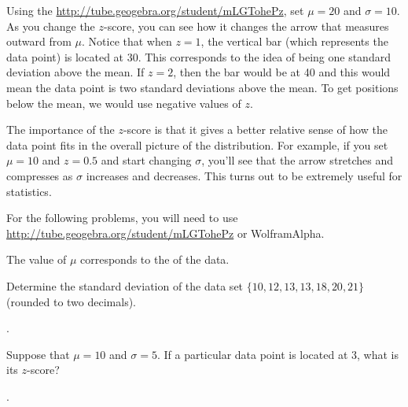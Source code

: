 \documentclass{ximera}
\begin{document}
Using the \href{http://tube.geogebra.org/student/mLGTohePz}{http://tube.geogebra.org/student/mLGTohePz}, set $\mu = 20$ and $\sigma = 10$. As you change the $z$-score, you can see how it changes the arrow that measures outward from $\mu$. Notice that when $z = 1$, the vertical bar (which represents the data point) is located at 30. This corresponds to the idea of being one standard deviation above the mean. If $z = 2$, then the bar would be at 40 and this would mean the data point is two standard deviations above the mean. To get positions below the mean, we would use negative values of $z$.

The importance of the $z$-score is that it gives a better relative sense of how the data point fits in the overall picture of the distribution. For example, if you set $\mu = 10$ and $z = 0.5$ and start changing $\sigma$, you'll see that the arrow stretches and compresses as $\sigma$ increases and decreases. This turns out to be extremely useful for statistics.

For the following problems, you will need to use \href{http://tube.geogebra.org/student/mLGTohePz}{http://tube.geogebra.org/student/mLGTohePz} or WolframAlpha.

\begin{question}
The value of $\mu$ corresponds to the \underline{\hspace{30pt}} of the data.

    \begin{multipleChoice}
    \end{multipleChoice}

\end{question}

\begin{question}
Determine the standard deviation of the data set $\{ 10, 12, 13, 13, 18, 20, 21\}$ (rounded to two decimals).

    .

\end{question}

\begin{question}
Suppose that $\mu = 10$ and $\sigma = 5$. If a particular data point is located at 3, what is its $z$-score?

    .

\end{question}
\end{document}
